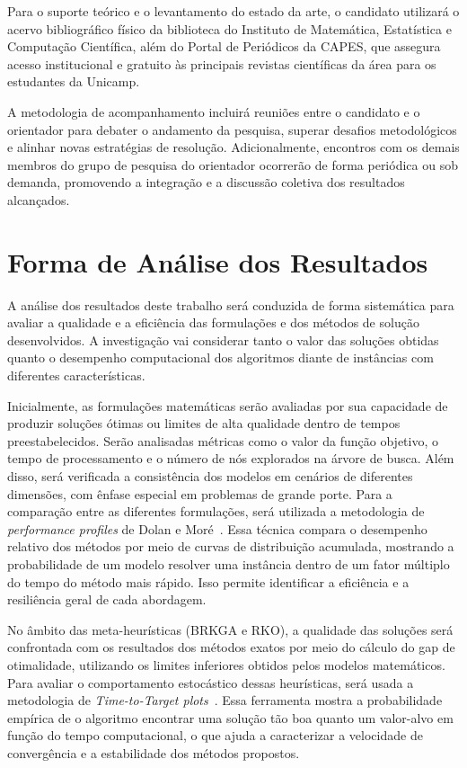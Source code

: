 \documentclass[11pt]{article}
\begin{document}
Para o suporte teórico e o levantamento do estado da arte, o candidato utilizará o acervo bibliográfico físico da biblioteca do Instituto de Matemática, Estatística e Computação Científica, além do Portal de Periódicos da CAPES, que assegura acesso institucional e gratuito às principais revistas científicas da área para os estudantes da Unicamp.

A metodologia de acompanhamento incluirá reuniões entre o candidato e o orientador para debater o andamento da pesquisa, superar desafios metodológicos e alinhar novas estratégias de resolução. Adicionalmente, encontros com os demais membros do grupo de pesquisa do orientador ocorrerão de forma periódica ou sob demanda, promovendo a integração e a discussão coletiva dos resultados alcançados. 
\section{Forma de Análise dos Resultados}













A análise dos resultados deste trabalho será conduzida de forma sistemática para avaliar a qualidade e a eficiência das formulações e dos métodos de solução desenvolvidos. A investigação vai considerar tanto o valor das soluções obtidas quanto o desempenho computacional dos algoritmos diante de instâncias com diferentes características.

Inicialmente, as formulações matemáticas serão avaliadas por sua capacidade de produzir soluções ótimas ou limites de alta qualidade dentro de tempos preestabelecidos. Serão analisadas métricas como o valor da função objetivo, o tempo de processamento e o número de nós explorados na árvore de busca. Além disso, será verificada a consistência dos modelos em cenários de diferentes dimensões, com ênfase especial em problemas de grande porte. Para a comparação entre as diferentes formulações, será utilizada a metodologia de \emph{performance profiles} de Dolan e Moré~\cite{Dolan2002}. Essa técnica compara o desempenho relativo dos métodos por meio de curvas de distribuição acumulada, mostrando a probabilidade de um modelo resolver uma instância dentro de um fator múltiplo do tempo do método mais rápido. Isso permite identificar a eficiência e a resiliência geral de cada abordagem.

No âmbito das meta-heurísticas (BRKGA e RKO), a qualidade das soluções será confrontada com os resultados dos métodos exatos por meio do cálculo do gap de otimalidade, utilizando os limites inferiores obtidos pelos modelos matemáticos. Para avaliar o comportamento estocástico dessas heurísticas, será usada a metodologia de \emph{Time-to-Target plots}~\cite{aiex2007}. Essa ferramenta mostra a probabilidade empírica de o algoritmo encontrar uma solução tão boa quanto um valor-alvo em função do tempo computacional, o que ajuda a caracterizar a velocidade de convergência e a estabilidade dos métodos propostos.
\end{document}
